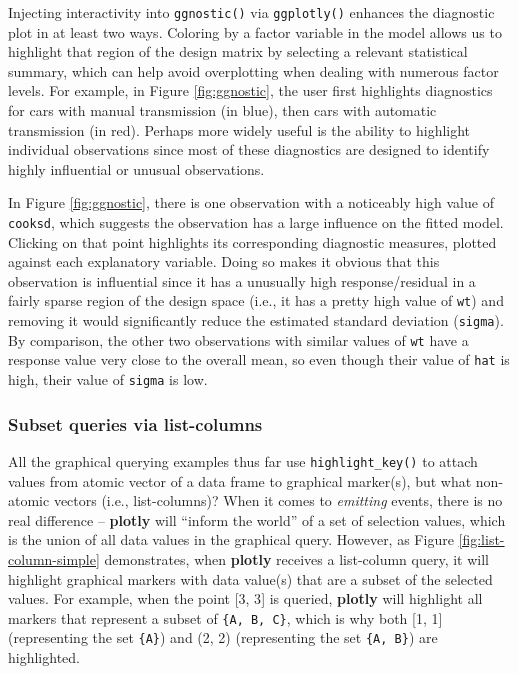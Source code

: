 \documentclass[
  12pt,
]{krantz}
\begin{document}
Injecting interactivity into \texttt{ggnostic()} via \texttt{ggplotly()} enhances the diagnostic plot in at least two ways. Coloring by a factor variable in the model allows us to highlight that region of the design matrix by selecting a relevant statistical summary, which can help avoid overplotting when dealing with numerous factor levels. For example, in Figure \ref{fig:ggnostic}, the user first highlights diagnostics for cars with manual transmission (in blue), then cars with automatic transmission (in red). Perhaps more widely useful is the ability to highlight individual observations since most of these diagnostics are designed to identify highly influential or unusual observations.

In Figure \ref{fig:ggnostic}, there is one observation with a noticeably high value of \texttt{cooksd}, which suggests the observation has a large influence on the fitted model. Clicking on that point highlights its corresponding diagnostic measures, plotted against each explanatory variable. Doing so makes it obvious that this observation is influential since it has a unusually high response/residual in a fairly sparse region of the design space (i.e., it has a pretty high value of \texttt{wt}) and removing it would significantly reduce the estimated standard deviation (\texttt{sigma}). By comparison, the other two observations with similar values of \texttt{wt} have a response value very close to the overall mean, so even though their value of \texttt{hat} is high, their value of \texttt{sigma} is low.

\hypertarget{subset-queries-via-list-columns}{%
\subsubsection{Subset queries via list-columns}\label{subset-queries-via-list-columns}}


All the graphical querying examples thus far use \texttt{highlight\_key()} to attach values from atomic vector of a data frame to graphical marker(s), but what non-atomic vectors (i.e., list-columns)? When it comes to \emph{emitting} events, there is no real difference -- \textbf{plotly} will ``inform the world'' of a set of selection values, which is the union of all data values in the graphical query. However, as Figure \ref{fig:list-column-simple} demonstrates, when \textbf{plotly} receives a list-column query, it will highlight graphical markers with data value(s) that are a subset of the selected values. For example, when the point {[}3, 3{]} is queried, \textbf{plotly} will highlight all markers that represent a subset of \texttt{\{A,\ B,\ C\}}, which is why both {[}1, 1{]} (representing the set \texttt{\{A\}}) and (2, 2) (representing the set \texttt{\{A,\ B\}}) are highlighted.
\end{document}
